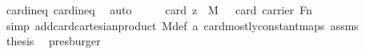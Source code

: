 \begin{isabellebody}
\ card{\isacharunderscore}{\kern0pt}ineq{\isacharunderscore}{\kern0pt}{}\ card{\isacharunderscore}{\kern0pt}ineq{\isacharunderscore}{\kern0pt}{}\ \isamarkupfalse%
\ auto\isanewline
\ \ \isamarkupfalse%
\ \isamarkupfalse%
\ {\isachardoublequoteopen}card\ {\isacharparenleft}{\kern0pt}{\isacharbraceleft}{\kern0pt}z{\isacharbraceright}{\kern0pt}\ {\isasymtimes}\ M{\isacharparenright}{\kern0pt}\ {\isacharequal}{\kern0pt}\ \ card\ {\isacharparenleft}{\kern0pt}carrier\ F{\isacharparenright}{\kern0pt}{\isacharcircum}{\kern0pt}n{\isachardoublequoteclose}\isanewline
\ \ \ \ \isamarkupfalse%
\ {\isacharparenleft}{\kern0pt}simp\ add{\isacharcolon}{\kern0pt}card{\isacharunderscore}{\kern0pt}cartesian{\isacharunderscore}{\kern0pt}product\ M{\isacharunderscore}{\kern0pt}def\ a\ card{\isacharunderscore}{\kern0pt}mostly{\isacharunderscore}{\kern0pt}constant{\isacharunderscore}{\kern0pt}maps\ assms{\isacharparenleft}{\kern0pt}{}{\isacharparenright}{\kern0pt}\ {\isacharparenright}{\kern0pt}\isanewline
\ \ \isamarkupfalse%
\ \isamarkupfalse%
\ {\isacharquery}{\kern0pt}thesis\ \isamarkupfalse%
\ presburger\isanewline
{}\isamarkupfalse%
%
\endisatagproof
{\isafoldproof}%
%
\isadelimproof
\isanewline
%
\endisadelimproof
%
\isadelimtheory
\isanewline
%
\endisadelimtheory
%
\isatagtheory
{}\isamarkupfalse%
%
\endisatagtheory
{\isafoldtheory}%
%
\isadelimtheory
%
\endisadelimtheory
%
\end{isabellebody}%
\endinput

